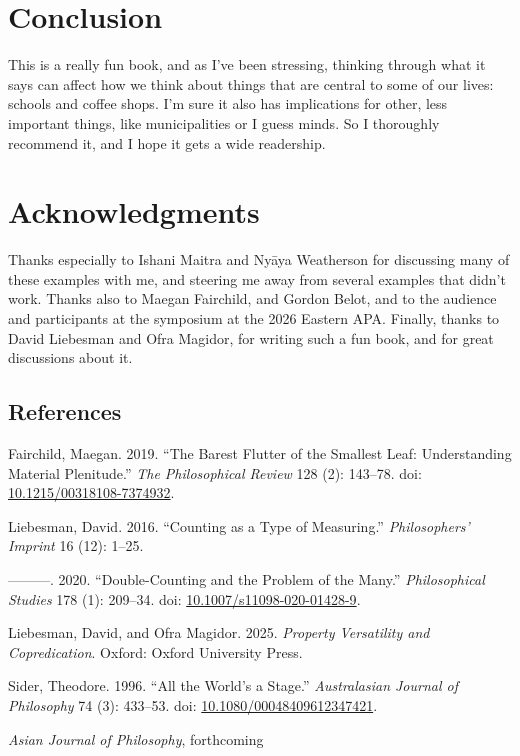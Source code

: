 \documentclass[
  11pt,
  letterpaper,
  DIV=11,
  numbers=noendperiod,
  twoside]{scrartcl}
\newlength{\cslhangindent}
\newenvironment{CSLReferences}[2] %
 {\begin{list}{}{%
  \setlength{\itemindent}{0pt}
  \setlength{\leftmargin}{0pt}
  \setlength{\parsep}{0pt}
  \ifodd #1
   \setlength{\leftmargin}{\cslhangindent}
   \setlength{\itemindent}{-1\cslhangindent}
  \fi
  \setlength{\itemsep}{#2\baselineskip}}}
 {\end{list}}
\begin{document}
\section{Conclusion}\label{conclusion}

This is a really fun book, and as I've been stressing, thinking through
what it says can affect how we think about things that are central to
some of our lives: schools and coffee shops. I'm sure it also has
implications for other, less important things, like municipalities or I
guess minds. So I thoroughly recommend it, and I hope it gets a wide
readership.

\section{Acknowledgments}\label{acknowledgments}

Thanks especially to Ishani Maitra and Nyāya Weatherson for discussing
many of these examples with me, and steering me away from several
examples that didn't work. Thanks also to Maegan Fairchild, and Gordon
Belot, and to the audience and participants at the symposium at the 2026
Eastern APA. Finally, thanks to David Liebesman and Ofra Magidor, for
writing such a fun book, and for great discussions about it.

\subsection*{References}\label{references}

\protect{}\label{refs}
\begin{CSLReferences}{1}{0}
Fairchild, Maegan. 2019. {``The Barest Flutter of the Smallest Leaf:
Understanding Material Plenitude.''} \emph{The Philosophical Review} 128
(2): 143--78. doi:
\href{https://doi.org/10.1215/00318108-7374932}{10.1215/00318108-7374932}.

Liebesman, David. 2016. {``Counting as a Type of Measuring.''}
\emph{Philosophers' Imprint} 16 (12): 1--25.

---------. 2020. {``Double-Counting and the Problem of the Many.''}
\emph{Philosophical Studies} 178 (1): 209--34. doi:
\href{https://doi.org/10.1007/s11098-020-01428-9}{10.1007/s11098-020-01428-9}.

Liebesman, David, and Ofra Magidor. 2025. \emph{Property Versatility and
Copredication}. Oxford: Oxford University Press.

Sider, Theodore. 1996. {``All the World's a Stage.''} \emph{Australasian
Journal of Philosophy} 74 (3): 433--53. doi:
\href{https://doi.org/10.1080/00048409612347421}{10.1080/00048409612347421}.

\end{CSLReferences}



\noindent \textit{Asian Journal of Philosophy}, forthcoming
\end{document}
